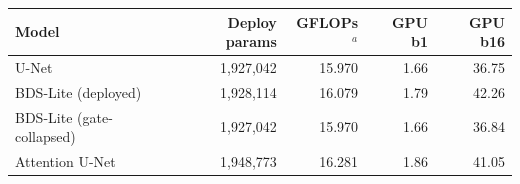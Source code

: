 \begin{tabular*}{\linewidth}{@{\extracolsep{\fill}}lrrrr@{}}
\toprule
Model & Deploy params & GFLOPs$^a$ & GPU b1 & GPU b16 \\
\midrule
U-Net & 1,927,042 & 15.970 & 1.66 & 36.75 \\
BDS-Lite (deployed) & 1,928,114 & 16.079 & 1.79 & 42.26 \\
BDS-Lite (gate-collapsed) & 1,927,042 & 15.970 & 1.66 & 36.84 \\
Attention U-Net & 1,948,773 & 16.281 & 1.86 & 41.05 \\
\bottomrule
\end{tabular*}
